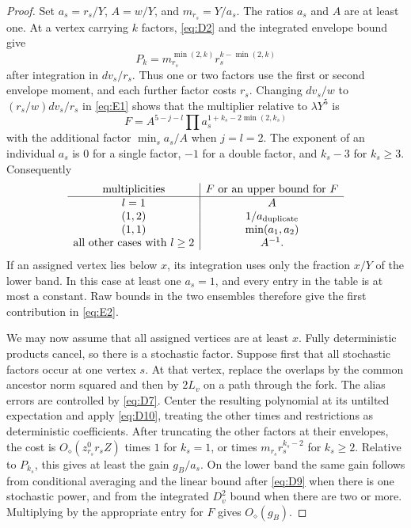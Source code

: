 \begin{proof}
Set \(a_s=r_s/Y\), \(A=w/Y\), and \(m_{r_s}=Y/a_s\). The ratios
\(a_s\) and \(A\) are at least one. At a vertex carrying \(k\) factors,
\eqref{eq:D2} and the integrated envelope bound give
\[
 P_k=m_{r_s}^{\min(2,k)}r_s^{k-\min(2,k)}
\]
after integration in \(dv_s/r_s\). Thus one or two factors use the
first or second envelope moment, and each further factor costs \(r_s\).
Changing \(dv_s/w\) to \((r_s/w)dv_s/r_s\) in \eqref{eq:E1} shows that
the multiplier relative to \(\lambda Y^5\) is
\[
 F=A^{5-j-l}\prod a_s^{1+k_s-2\min(2,k_s)}
\]
with the additional factor \(\min_s a_s/A\) when \(j=l=2\).
The exponent of an individual \(a_s\) is \(0\) for a single factor,
\(-1\) for a double factor, and \(k_s-3\) for \(k_s\ge3\). Consequently
\[
\begin{array}{c|c}
\text{multiplicities}&F\text{ or an upper bound for }F\\ \hline
l=1&A\\
(1,2)&1/a_{\rm duplicate}\\
(1,1)&\min(a_1,a_2)\\
\text{all other cases with }l\ge2&A^{-1}.
\end{array}
\]
If an assigned vertex lies below \(x\), its integration uses only the
fraction \(x/Y\) of the lower band. In this case at least one \(a_s=1\),
and every entry in the table is at most a constant. Raw bounds in the
two ensembles therefore give the first contribution in \eqref{eq:E2}.

We may now assume that all assigned vertices are at least \(x\).
Fully deterministic products cancel, so there is a stochastic factor.
Suppose first that all stochastic factors occur at one vertex \(s\).
At that vertex, replace the overlaps by the common ancestor norm
squared and then by \(2L_v\) on a path through the fork. The alias
errors are controlled by \eqref{eq:D7}. Center the resulting polynomial
at its untilted expectation and apply \eqref{eq:D10}, treating the
other times and restrictions as deterministic coefficients. After
truncating the other factors at their envelopes, the cost is
\(O_\diamond(z_{r_s}^0r_sZ)\) times \(1\) for \(k_s=1\), or times
\(m_{r_s}r_s^{k_s-2}\) for \(k_s\ge2\). Relative to \(P_{k_s}\), this
gives at least the gain \(g_B/a_s\). On the lower band the same gain
follows from conditional averaging and the linear bound after
\eqref{eq:D9} when there is one stochastic power, and from the
integrated \(D_v^2\) bound when there are two or more. Multiplying by
the appropriate entry for \(F\) gives \(O_\diamond(g_B)\).


\end{proof}
